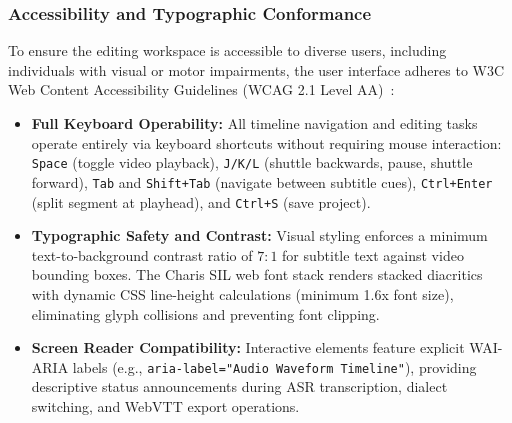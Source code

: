 \documentclass[a4paper,11pt]{article}
\begin{document}
\subsubsection{Accessibility and Typographic Conformance}
\label{sec:chap3_gov_accessibility}
To ensure the editing workspace is accessible to diverse users, including individuals with visual or motor impairments, the user interface adheres to W3C Web Content Accessibility Guidelines (WCAG 2.1 Level AA)~\cite{norman1986user}:
\begin{itemize}
    \item \textbf{Full Keyboard Operability:} All timeline navigation and editing tasks operate entirely via keyboard shortcuts without requiring mouse interaction: \texttt{Space} (toggle video playback), \texttt{J/K/L} (shuttle backwards, pause, shuttle forward), \texttt{Tab} and \texttt{Shift+Tab} (navigate between subtitle cues), \texttt{Ctrl+Enter} (split segment at playhead), and \texttt{Ctrl+S} (save project).
    \item \textbf{Typographic Safety and Contrast:} Visual styling enforces a minimum text-to-background contrast ratio of $7:1$ for subtitle text against video bounding boxes. The Charis SIL web font stack renders stacked diacritics with dynamic CSS line-height calculations (minimum 1.6x font size), eliminating glyph collisions and preventing font clipping.
    \item \textbf{Screen Reader Compatibility:} Interactive elements feature explicit WAI-ARIA labels (e.g., \texttt{aria-label="Audio Waveform Timeline"}), providing descriptive status announcements during ASR transcription, dialect switching, and WebVTT export operations.
\end{itemize}
\end{document}
